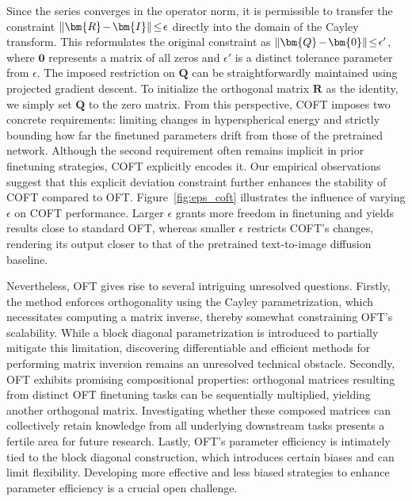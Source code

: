 \begin{itemize}[leftmargin=*,nosep]
Since the series converges in the operator norm, it is permissible to transfer the constraint $\thickmuskip=2mu \medmuskip=2mu\|\bm{R}-\bm{I}\|\leq\epsilon$ directly into the domain of the Cayley transform. This reformulates the original constraint as $\thickmuskip=2mu \medmuskip=2mu \|\bm{Q}-\bm{0}\|\leq\epsilon'$, where $\bm{0}$ represents a matrix of all zeros and $\epsilon'$ is a distinct tolerance parameter from $\epsilon$. The imposed restriction on $\bm{Q}$ can be straightforwardly maintained using projected gradient descent. To initialize the orthogonal matrix $\bm{R}$ as the identity, we simply set $\bm{Q}$ to the zero matrix. From this perspective, COFT imposes two concrete requirements: limiting changes in hyperspherical energy and strictly bounding how far the finetuned parameters drift from those of the pretrained network. Although the second requirement often remains implicit in prior finetuning strategies, COFT explicitly encodes it. Our empirical observations suggest that this explicit deviation constraint further enhances the stability of COFT compared to OFT. Figure~\ref{fig:eps_coft} illustrates the influence of varying $\epsilon$ on COFT performance. Larger $\epsilon$ grants more freedom in finetuning and yields results close to standard OFT, whereas smaller $\epsilon$ restricts COFT's changes, rendering its output closer to that of the pretrained text-to-image diffusion baseline.

Nevertheless, OFT gives rise to several intriguing unresolved questions. Firstly, the method enforces orthogonality using the Cayley parametrization, which necessitates computing a matrix inverse, thereby somewhat constraining OFT's scalability. While a block diagonal parametrization is introduced to partially mitigate this limitation, discovering differentiable and efficient methods for performing matrix inversion remains an unresolved technical obstacle. Secondly, OFT exhibits promising compositional properties: orthogonal matrices resulting from distinct OFT finetuning tasks can be sequentially multiplied, yielding another orthogonal matrix. Investigating whether these composed matrices can collectively retain knowledge from all underlying downstream tasks presents a fertile area for future research. Lastly, OFT’s parameter efficiency is intimately tied to the block diagonal construction, which introduces certain biases and can limit flexibility. Developing more effective and less biased strategies to enhance parameter efficiency is a crucial open challenge.


\end{itemize}
